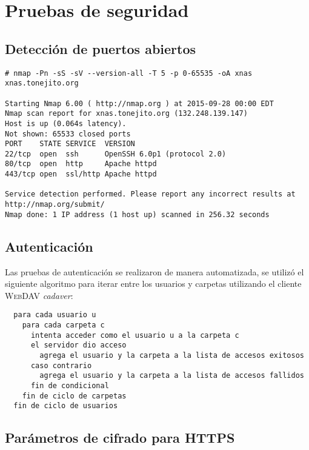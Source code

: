     \section {Pruebas de seguridad}

      \subsection {Detecci\'{o}n de puertos abiertos}

{
\scriptsize
\linespread{1}
\begin{verbatim}
# nmap -Pn -sS -sV --version-all -T 5 -p 0-65535 -oA xnas xnas.tonejito.org

Starting Nmap 6.00 ( http://nmap.org ) at 2015-09-28 00:00 EDT
Nmap scan report for xnas.tonejito.org (132.248.139.147)
Host is up (0.064s latency).
Not shown: 65533 closed ports
PORT    STATE SERVICE  VERSION
22/tcp  open  ssh      OpenSSH 6.0p1 (protocol 2.0)
80/tcp  open  http     Apache httpd
443/tcp open  ssl/http Apache httpd

Service detection performed. Please report any incorrect results at http://nmap.org/submit/
Nmap done: 1 IP address (1 host up) scanned in 256.32 seconds
\end{verbatim}
}


      \subsection {Autenticaci\'{o}n}

Las pruebas de autenticaci\'{o}n se realizaron de manera automatizada, se utiliz\'{o} el siguiente algoritmo para iterar entre los usuarios y carpetas utilizando el cliente \textsc{WebDAV} \textsl{cadaver}:

{
\scriptsize
\linespread{1}
\begin{verbatim}
  para cada usuario u
    para cada carpeta c
      intenta acceder como el usuario u a la carpeta c
      el servidor dio acceso
        agrega el usuario y la carpeta a la lista de accesos exitosos
      caso contrario
        agrega el usuario y la carpeta a la lista de accesos fallidos
      fin de condicional
    fin de ciclo de carpetas
  fin de ciclo de usuarios
\end{verbatim}
}

      \subsection {Par\'{a}metros de cifrado para \textsc{HTTPS}}

